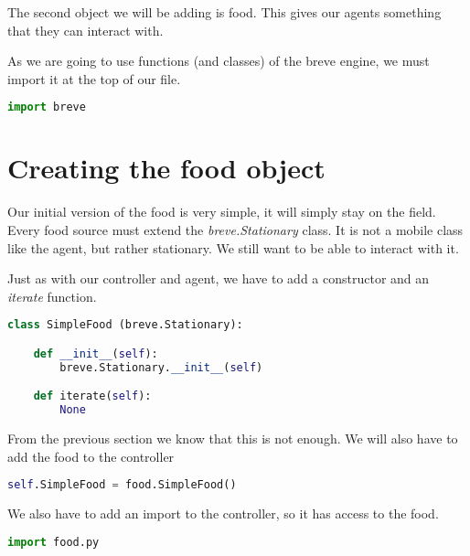 The second object we will be adding is food. This gives our agents something that they can interact with.


As we are going to use functions (and classes) of the breve engine, we must import it at the top of our file.

\begin{lstlisting}[language=Python]
import breve
\end{lstlisting}


\section{Creating the food object}

Our initial version of the food is very simple, it will simply stay on the field. Every food source must extend the \textit{breve.Stationary} class. It is not a mobile class like the agent, but rather stationary. We still want to be able to interact with it.

Just as with our controller and agent, we have to add a constructor and an \textit{iterate} function.

\begin{lstlisting}[language=Python]
class SimpleFood (breve.Stationary):

    def __init__(self):
        breve.Stationary.__init__(self)

    def iterate(self):
        None
\end{lstlisting}


From the previous section we know that this is not enough. We will also have to add the food to the controller

\begin{lstlisting}[language=Python]
self.SimpleFood = food.SimpleFood()
\end{lstlisting}


We also have to add an import to the controller, so it has access to the food.

\begin{lstlisting}[language=Python]
import food.py
\end{lstlisting}

